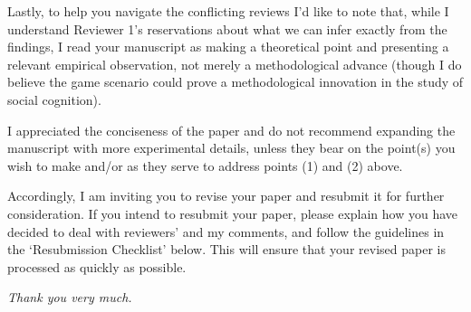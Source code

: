 \documentclass[a4paper]{article}
\newtheorem{response}{Response}
\begin{document}
Lastly, to help you navigate the conflicting reviews I’d like to note that, while I understand Reviewer 1’s reservations about what we can infer exactly from the findings, I read your manuscript as making a theoretical point and presenting a relevant empirical observation, not merely a methodological advance (though I do believe the game scenario could prove a methodological innovation in the study of social cognition). 


I appreciated the conciseness of the paper and do not recommend expanding the manuscript with more experimental details, unless they bear on the point(s) you wish to make and/or as they serve to address points (1) and (2) above. 

Accordingly, I am inviting you to revise your paper and resubmit it for further consideration. If you intend to resubmit your paper, please explain how you have decided to deal with reviewers’ and my comments, and follow the guidelines in the ‘Resubmission Checklist’ below. This will ensure that your revised paper is processed as quickly as possible. 

\medskip
{\noindent \itshape
Thank you very much. 
}




\end{document}
